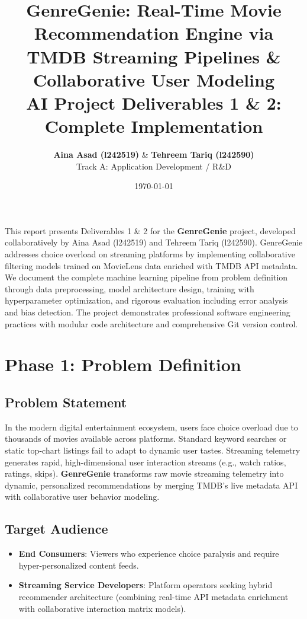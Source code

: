 \documentclass[11pt,a4paper]{article}
\title{\color{purpleDark}\textbf{GenreGenie: Real-Time Movie Recommendation Engine via TMDB Streaming Pipelines \& Collaborative User Modeling}\\ \large\color{purpleGray} AI Project Deliverables 1 \& 2: Complete Implementation}
\author{\textbf{Aina Asad (l242519)} \& \textbf{Tehreem Tariq (l242590)} \\ Track A: Application Development / R\&D}
\date{\today}
\renewenvironment{abstract}{%
\begin{tcolorbox}[enhanced, breakable, arc=4pt, boxrule=0.8pt,
  colback=purpleLight, colframe=purpleDark,
  title=Abstract, fonttitle=\sffamily\bfseries\small,
  coltitle=white, colbacktitle=purpleDark,
  left=8pt, right=8pt, top=6pt, bottom=6pt,
  before skip=10pt, after skip=14pt]\small
}{\end{tcolorbox}}
\begin{document}
\maketitle
\vspace{-0.5em}

\begin{abstract}
This report presents Deliverables 1 \& 2 for the \textbf{GenreGenie} project, developed collaboratively by Aina Asad (l242519) and Tehreem Tariq (l242590). GenreGenie addresses choice overload on streaming platforms by implementing collaborative filtering models trained on MovieLens data enriched with TMDB API metadata. We document the complete machine learning pipeline from problem definition through data preprocessing, model architecture design, training with hyperparameter optimization, and rigorous evaluation including error analysis and bias detection. The project demonstrates professional software engineering practices with modular code architecture and comprehensive Git version control.
\end{abstract}

\section{Phase 1: Problem Definition}

\subsection{Problem Statement}
In the modern digital entertainment ecosystem, users face choice overload due to thousands of movies available across platforms. Standard keyword searches or static top-chart listings fail to adapt to dynamic user tastes. Streaming telemetry generates rapid, high-dimensional user interaction streams (e.g., watch ratios, ratings, skips). \textbf{GenreGenie} transforms raw movie streaming telemetry into dynamic, personalized recommendations by merging TMDB's live metadata API with collaborative user behavior modeling.

\subsection{Target Audience}
\begin{itemize}
    \item \textbf{End Consumers}: Viewers who experience choice paralysis and require hyper-personalized content feeds.
    \item \textbf{Streaming Service Developers}: Platform operators seeking hybrid recommender architecture (combining real-time API metadata enrichment with collaborative interaction matrix models).
\end{itemize}
\end{document}
